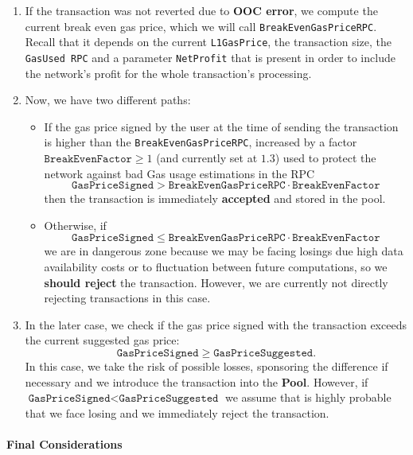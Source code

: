 \begin{enumerate}
\item If the transaction was not reverted due to \textbf{OOC error}, we compute the current break even gas price, which we will call \texttt{BreakEvenGasPriceRPC}. Recall that it depends on the current \texttt{L1GasPrice}, the transaction size, the \texttt{GasUsed RPC} and a parameter \texttt{NetProfit} that is present in order to include the network's profit for the whole transaction's processing.

\item Now, we have two different paths:

\begin{itemize}

\item If the gas price signed by the user at the time of sending the transaction is higher than the \texttt{BreakEvenGasPriceRPC}, increased by a factor $\texttt{BreakEvenFactor} \geq 1$ (and currently set at $1.3$) used to protect the network against bad Gas usage estimations in the RPC
\[
\texttt{GasPriceSigned} > \texttt{BreakEvenGasPriceRPC} \cdot \texttt{BreakEvenFactor}
\]
then the transaction is immediately \textbf{accepted} and stored in the pool.

\item Otherwise, if
\[
\texttt{GasPriceSigned} \leq \texttt{BreakEvenGasPriceRPC} \cdot \texttt{BreakEvenFactor}
\]
we are in dangerous zone because we may be facing losings due high data availability costs or to fluctuation between future computations, so we \textbf{should reject} the transaction. However, we are currently not directly rejecting transactions in this case.

\end{itemize}

\item In the later case, we check if the gas price signed with the transaction exceeds the current suggested gas price:
\[
\texttt{GasPriceSigned} \geq \texttt{GasPriceSuggested}.
\]
In this case, we take the risk of possible losses, sponsoring the difference if necessary and we introduce the transaction into the \textbf{Pool}. However, if $\texttt{GasPriceSigned} < \texttt{GasPriceSuggested}$ we assume that is highly probable that we face losing and we immediately reject the transaction.

\end{enumerate}


\paragraph*{Final Considerations}

